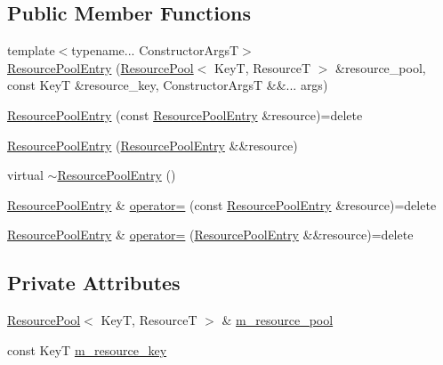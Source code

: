 \subsection*{Public Member Functions}
\begin{DoxyCompactItemize}
\item 
{\footnotesize template$<$typename... Constructor\+ArgsT$>$ }\\\hyperlink{structmage_1_1_resource_pool_1_1_resource_pool_entry_a90ac92f31efd6b6aebe4bf670b6dcec1}{Resource\+Pool\+Entry} (\hyperlink{classmage_1_1_resource_pool}{Resource\+Pool}$<$ KeyT, ResourceT $>$ \&resource\+\_\+pool, const KeyT \&resource\+\_\+key, Constructor\+ArgsT \&\&... args)
\item 
\hyperlink{structmage_1_1_resource_pool_1_1_resource_pool_entry_a10ba1bc114b97a82fc957b17c3bef56e}{Resource\+Pool\+Entry} (const \hyperlink{structmage_1_1_resource_pool_1_1_resource_pool_entry}{Resource\+Pool\+Entry} \&resource)=delete
\item 
\hyperlink{structmage_1_1_resource_pool_1_1_resource_pool_entry_a9a6d3bb435ebc41ca6f78709e4f4cd39}{Resource\+Pool\+Entry} (\hyperlink{structmage_1_1_resource_pool_1_1_resource_pool_entry}{Resource\+Pool\+Entry} \&\&resource)
\item 
virtual \hyperlink{structmage_1_1_resource_pool_1_1_resource_pool_entry_ae8d7b54f633fb865e2c299d2fd2bf466}{$\sim$\+Resource\+Pool\+Entry} ()
\item 
\hyperlink{structmage_1_1_resource_pool_1_1_resource_pool_entry}{Resource\+Pool\+Entry} \& \hyperlink{structmage_1_1_resource_pool_1_1_resource_pool_entry_a2a08bf48f2dce191a23f088530879ca0}{operator=} (const \hyperlink{structmage_1_1_resource_pool_1_1_resource_pool_entry}{Resource\+Pool\+Entry} \&resource)=delete
\item 
\hyperlink{structmage_1_1_resource_pool_1_1_resource_pool_entry}{Resource\+Pool\+Entry} \& \hyperlink{structmage_1_1_resource_pool_1_1_resource_pool_entry_ab9de5fdfecd8e19a510541b9353fe854}{operator=} (\hyperlink{structmage_1_1_resource_pool_1_1_resource_pool_entry}{Resource\+Pool\+Entry} \&\&resource)=delete
\end{DoxyCompactItemize}
\subsection*{Private Attributes}
\begin{DoxyCompactItemize}
\item 
\hyperlink{classmage_1_1_resource_pool}{Resource\+Pool}$<$ KeyT, ResourceT $>$ \& \hyperlink{structmage_1_1_resource_pool_1_1_resource_pool_entry_a657a97767707dbb045f49440dff4c126}{m\+\_\+resource\+\_\+pool}
\item 
const KeyT \hyperlink{structmage_1_1_resource_pool_1_1_resource_pool_entry_a6cfd8e2ed45a7655aff852e494054865}{m\+\_\+resource\+\_\+key}
\end{DoxyCompactItemize}


